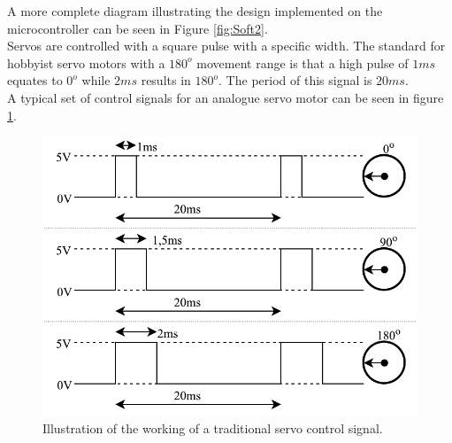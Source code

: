 A more complete diagram illustrating the design implemented on the microcontroller can be seen in Figure \ref{fig:Soft2}.\\

Servos are controlled with a square pulse with a specific width. The standard for hobbyist servo motors with a $180^o$ movement range is that a high pulse of $1ms$ equates to $0^o$ while $2ms$ results in $180^o$. The period of this signal is $20ms$.\\

A typical set of control signals for an analogue servo motor can be seen in figure \ref{fig:Servo1}.

\begin{figure}[H]
\centering
\includegraphics[scale = 1]{pics/Servo1.pdf}
\caption{Illustration of the working of a traditional servo control signal.}
\label{fig:Servo1}
\end{figure}

